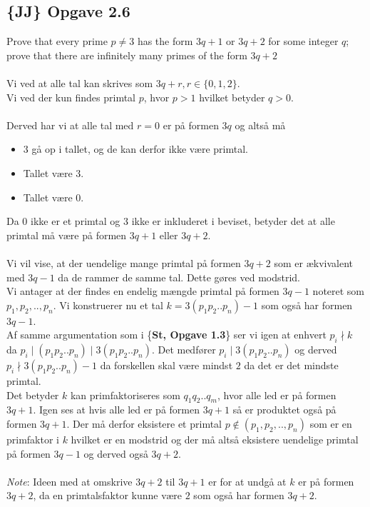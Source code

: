 \documentclass[12pt]{article}
\begin{document}
\subsection*{\{\textbf{JJ}\} Opgave 2.6}
Prove that every prime $p\neq 3$ has the form $3q+1$ or $3q+2$ for some integer $q$; prove that there are infinitely many primes of the form $3q+2$\\
\\
Vi ved at alle tal kan skrives som $3q+r,r\in \{0,1,2\}$.\\
Vi ved der kun findes primtal $p$, hvor $p>1$ hvilket betyder $q> 0$.\\
\\
Derved har vi at alle tal med $r=0$ er på formen $3q$ og altså må
\begin{itemize}
\item $3$ gå op i tallet, og de kan derfor ikke være primtal.
\item Tallet være $3$.
\item Tallet være 0.
\end{itemize}
Da $0$ ikke er et primtal og $3$ ikke er inkluderet i beviset, betyder det at alle primtal må være på formen $3q+1$ eller $3q+2$.\\
\\
Vi vil vise, at der uendelige mange primtal på formen $3q+2$ som er ækvivalent med $3q-1$ da de rammer de samme tal. Dette gøres ved modstrid.\\
Vi antager at der findes en endelig mængde primtal på formen $3q-1$ noteret som $p_1,p_2,..,p_n$. Vi konstruerer nu et tal $k=3(p_1p_2..p_n)-1$ som også har formen $3q-1$.\\
Af samme argumentation som i \{\textbf{St, Opgave 1.3}\} ser vi igen at enhvert $p_i \nmid k$ da $p_i\mid (p_1p_2..p_n)\mid 3(p_1p_2..p_n)$. Det medfører $p_i\mid 3(p_1p_2..p_n)$ og derved $p_i\nmid 3(p_1p_2..p_n)-1$ da forskellen skal være mindst $2$ da det er det mindste primtal.\\
Det betyder $k$ kan primfaktoriseres som $q_1q_2..q_m$, hvor alle led er på formen $3q+1$. Igen ses at hvis alle led er på formen $3q+1$ så er produktet også på formen $3q+1$. Der må derfor eksistere et primtal $p\notin (p_1,p_2,..,p_n)$ som er en primfaktor i $k$ hvilket er en modstrid og der må altså eksistere uendelige primtal på formen $3q-1$ og derved også $3q+2$.\\
\\
\textit{Note}: Ideen med at omskrive $3q+2$ til $3q+1$ er for at undgå at $k$ er på formen $3q+2$, da en primtalsfaktor kunne være $2$ som også har formen $3q+2$.
\end{document}
